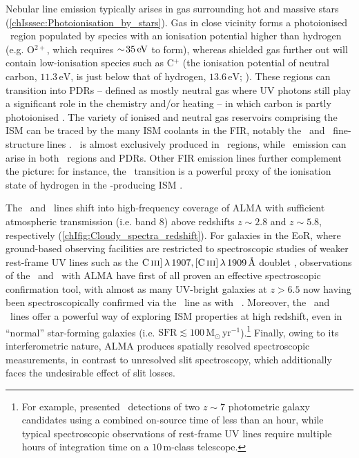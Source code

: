 Nebular line emission typically arises in gas surrounding hot and massive stars (\cref{chIsssec:Photoionisation_by_stars}). Gas in close vicinity forms a photoionised \HII\ region populated by species with an ionisation potential higher than hydrogen (e.g. O$^{2+}$, which requires $\sim \! 35 \, \mathrm{eV}$ to form), whereas shielded gas further out will contain low-ionisation species such as C$^+$ (the ionisation potential of neutral carbon, $11.3 \, \mathrm{eV}$, is just below that of hydrogen, $13.6 \, \mathrm{eV}$; \citealt{2005AAS...207.8117A}). These regions can transition into PDRs -- defined as mostly neutral gas where UV photons still play a significant role in the chemistry and/or heating -- in which carbon is partly photoionised \citep[instead of hydrogen, as in \HII\ regions;][]{1999RvMP...71..173H}. The variety of ionised and neutral gas reservoirs comprising the ISM can be traced by the many ISM coolants in the FIR, notably the \CIILam\ and \OIIILam\ fine-structure lines \citep[\CII\ and \OIIIf\ hereafter; see e.g.][]{2019PASJ...71...71H, 2019MNRAS.487.5902K, 2019MNRAS.487.1689P, 2020ApJ...896...93H, 2022ApJ...931..160B}. \OIIIf\ is almost exclusively produced in \HII\ regions, while \CII\ emission can arise in both \HII\ regions and PDRs. Other FIR emission lines further complement the picture: for instance, the \NIILam\ transition is a powerful proxy of the ionisation state of hydrogen in the \CII-producing ISM \citep[e.g.][]{2012A&A...542L..34N, 2014ApJ...782L..17D}.

The \CII\ and \OIIIf\ lines shift into high-frequency coverage of ALMA with sufficient atmospheric transmission (i.e. band 8) above redshifts $z \sim 2.8$ and $z \sim 5.8$, respectively (\cref{chIfig:Cloudy_spectra_redshift}). For galaxies in the EoR, where ground-based observing facilities are restricted to spectroscopic studies of weaker rest-frame UV lines such as the $\CIIIs \, \lambda \, 1907, \CIIIf \, \lambda \, 1909 \, \Angstrom$ doublet \citep[e.g.][]{2021ApJ...917L..36T}, observations of the \CII\ and \OIIIf\ with ALMA have first of all proven an effective spectroscopic confirmation tool, with almost as many UV-bright galaxies at $z > 6.5$ now having been spectroscopically confirmed via the \CII\ line as with  \lymana\ \citep[\lya;][]{2022ApJ...931..160B}. Moreover, the \OIIIf\ and \CII\ lines offer a powerful way of exploring ISM properties at high redshift, even in ``normal'' star-forming galaxies (i.e. $\text{SFR} \lesssim 100 \, \mathrm{M_\odot \, yr^{-1}}$).\footnote{For example, \citet{2018Natur.553..178S} presented \CII\ detections of two $z \sim 7$ photometric galaxy candidates using a combined on-source time of less than an hour, while typical spectroscopic observations of rest-frame UV lines require multiple hours of integration time on a $10 \, \mathrm{m}$-class telescope.} Finally, owing to its interferometric nature, ALMA produces spatially resolved spectroscopic measurements, in contrast to unresolved slit spectroscopy, which additionally faces the undesirable effect of slit losses.

